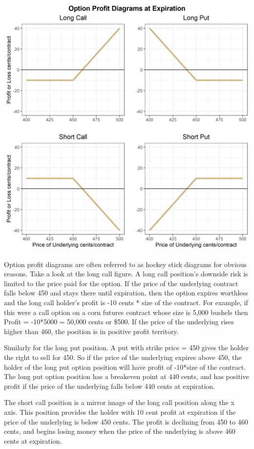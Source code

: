 \documentclass[
]{book}
\begin{document}
\includegraphics{assets/Options1-optionplot.png}

Option profit diagrams are often referred to as hockey stick diagrams for obvious reasons. Take a look at the long call figure. A long call position's downside risk is limited to the price paid for the option. If the price of the underlying contract falls below 450 and stays there until expiration, then the option expires worthless and the long call holder's profit is -10 cents * size of the contract. For example, if this were a call option on a corn futures contract whose size is 5,000 bushels then Profit = -10*5000 = 50,000 cents or \$500. If the price of the underlying rises higher than 460, the position is in positive profit territory.

Similarly for the long put position. A put with strike price = 450 gives the holder the right to sell for 450. So if the price of the underlying expires above 450, the holder of the long put option position will have profit of -10*size of the contract. The long put option position has a breakeven point at 440 cents, and has positive profit if the price of the underlying falls below 440 cents at expiration.

The short call position is a mirror image of the long call position along the x axis. This position provides the holder with 10 cent profit at expiration if the price of the underlying is below 450 cents. The profit is declining from 450 to 460 cents, and begins losing money when the price of the underlying is above 460 cents at expiration.
\end{document}
